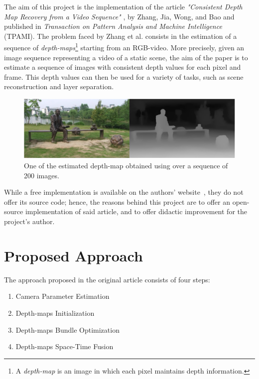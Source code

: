 \documentclass[notitlepage,english]{hgbreport}
\begin{document}
The aim of this project is the implementation of the article \textit{"Consistent Depth Map Recovery from a Video Sequence"} \cite{Zhang2009}, by Zhang, Jia, Wong, and Bao and published in \textit{Transaction on Pattern Analysis and Machine Intelligence} (TPAMI).
The problem faced by Zhang et al. consists in the estimation of a sequence of \emph{depth-maps}\footnote{A \emph{depth-map} is an image in which each pixel maintains depth information.} starting from an RGB-video.
More precisely, given an image sequence representing a video of a static scene, the aim of the paper is to estimate a sequence of images with consistent depth values for each pixel and frame.
This depth values can then be  used for a variety of tasks, such as scene reconstruction and layer separation.
\begin{figure}[!h]
	\centering
	\includegraphics[width=.95\textwidth]{depthmap_example.png} %
	\caption{One of the estimated depth-map  obtained using \cite{Zhang2009} over a sequence of 200 images.}
\end{figure}

While a free implementation is available on the authors' website~\cite{CVGweb}, they do not offer its source code; hence, the reasons behind this project are to offer an open-source implementation of said article, and to offer didactic improvement for the project's author.

\section{Proposed Approach}
The approach proposed in the original article consists of four steps:
\begin{enumerate}
	\item Camera Parameter Estimation
	\item Depth-maps Initialization
	\item Depth-maps Bundle Optimization
	\item Depth-maps Space-Time Fusion
\end{enumerate}
\end{document}
